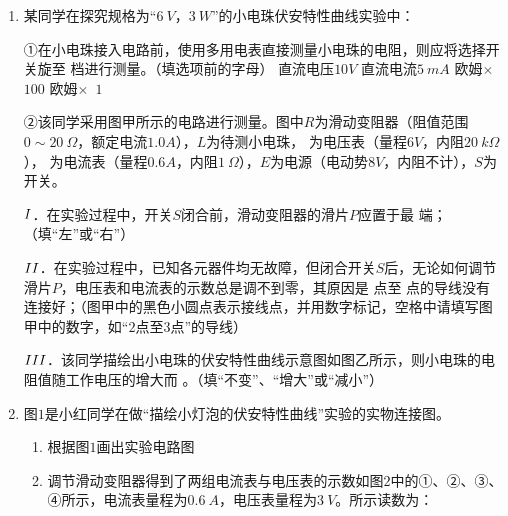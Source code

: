 \begin{enumerate}[leftmargin=0em]
\newpage
\item 
{}
某同学在探究规格为“$ 6\ V $，$ 3\ W $”的小电珠伏安特性曲线实验中：
\begin{figure}[h!]
\centering
 \qquad \qquad 
  
\end{figure}

①在小电珠接入电路前，使用多用电表直接测量小电珠的电阻，则应将选择开关旋至  
档进行测量。（填选项前的字母）
\fourchoices
{直流电压$ 10V $ }
{直流电流$ 5 \ mA $}
{欧姆$ \times $ $ 100 $ }
{欧姆$ \times $ $ 1 $}

②该同学采用图甲所示的电路进行测量。图中$ R $为滑动变阻器（阻值范围$ 0 \sim 20 \ \Omega $，额定电流$ 1.0A $），$ L $为待测小电珠， \voltmetermytikz 为电压表（量程$ 6V $，内阻$ 20 \ k\Omega $）， \ammetermytikz 为电流表（量程$ 0.6A $，内阻$ 1 \ \Omega $），$ E $为电源（电动势$ 8V $，内阻不计），$ S $为开关。

$ \lmd{1} $．在实验过程中，开关$ S $闭合前，滑动变阻器的滑片$ P $应置于最  
端；（填“左”或“右”）

$ \lmd{2} $．在实验过程中，已知各元器件均无故障，但闭合开关$ S $后，无论如何调节滑片$ P $，电压表和电流表的示数总是调不到零，其原因是  
点至  
点的导线没有连接好；（图甲中的黑色小圆点表示接线点，并用数字标记，空格中请填写图甲中的数字，如“$ 2 $点至$ 3 $点”的导线）

$ \lmd{3} $．该同学描绘出小电珠的伏安特性曲线示意图如图乙所示，则小电珠的电阻值随工作电压的增大而  
。（填“不变”、“增大”或“减小”）


\item 
{}
图$ 1 $是小红同学在做“描绘小灯泡的伏安特性曲线”实验的实物连接图。
\begin{figure}[h!]
\centering

\end{figure}

\begin{enumerate}
\renewcommand{\labelenumi}{\arabic{enumi}.}
\item
根据图$ 1 $画出实验电路图
\item 
调节滑动变阻器得到了两组电流表与电压表的示数如图$ 2 $中的①、②、③、④所示，电流表量程为$ 0.6\ A $，电压表量程为$ 3\ V $。所示读数为：


\end{enumerate}
\end{enumerate}

